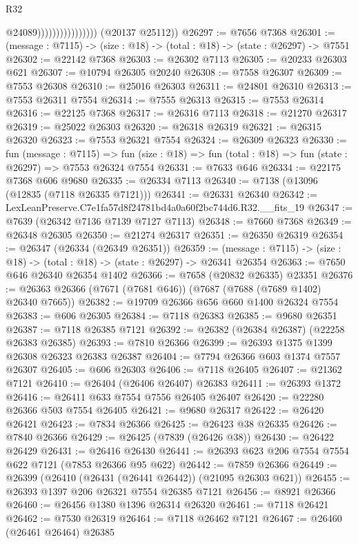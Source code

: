 \begin{lexlean}{R32}
\begin{coremodule}
                                      @24089))))))))))))))))
      (@20137 @25112))
@26297 := @7656 @7368
@26301 := (message : @7115) -> (size : @18) -> (total : @18) -> (state : @26297) -> @7551
@26302 := @22142 @7368
@26303 := @26302 @7113
@26305 := @20233 @26303 @621
@26307 := @10794 @26305 @20240
@26308 := @7558 @26307
@26309 := @7553 @26308
@26310 := @25016 @26303
@26311 := @24801 @26310
@26313 := @7553 @26311 @7554
@26314 := @7555 @26313
@26315 := @7553 @26314
@26316 := @22125 @7368
@26317 := @26316 @7113
@26318 := @21270 @26317
@26319 := @25022 @26303
@26320 := @26318 @26319
@26321 := @26315 @26320
@26323 := @7553 @26321 @7554
@26324 := @26309 @26323
@26330 := fun (message : @7115) =>
  fun (size : @18) => fun (total : @18) => fun (state : @26297) => @7553 @26324 @7554
@26331 := @7633 @646
@26334 := @22175 @7368 @606 @9680
@26335 := @26334 @7113
@26340 := @7138 (@13096 (@12835 (@7118 @26335 @7121)))
@26341 := @26331 @26340
@26342 := LexLeanPreserve.C7e1fa57d8f24781bd4a0a60f2bc744d6.R32.__fits_19
@26347 := @7639 (@26342 @7136 @7139 @7127 @7113)
@26348 := @7660 @7368
@26349 := @26348 @26305
@26350 := @21274 @26317
@26351 := @26350 @26319
@26354 := @26347 (@26334 (@26349 @26351))
@26359 := (message : @7115) -> (size : @18) -> (total : @18) -> (state : @26297) -> @26341 @26354
@26363 := @7650 @646 @26340 @26354 @1402
@26366 := @7658 (@20832 @26335) @23351
@26376 := @26363 @26366 (@7671 (@7681 @646)) (@7687 (@7688 (@7689 @1402) @26340 @7665))
@26382 := @19709 @26366 @656 @660 @1400 @26324 @7554
@26383 := @606 @26305
@26384 := @7118 @26383
@26385 := @9680 @26351
@26387 := @7118 @26385 @7121
@26392 := @26382 (@26384 @26387) (@22258 @26383 @26385)
@26393 := @7810 @26366
@26399 := @26393 @1375 @1399 @26308 @26323 @26383 @26387
@26404 := @7794 @26366 @603 @1374 @7557 @26307
@26405 := @606 @26303
@26406 := @7118 @26405
@26407 := @21362 @7121
@26410 := @26404 (@26406 @26407) @26383
@26411 := @26393 @1372
@26416 := @26411 @633 @7554 @7556 @26405 @26407
@26420 := @22280 @26366 @503 @7554 @26405
@26421 := @9680 @26317
@26422 := @26420 @26421
@26423 := @7834 @26366
@26425 := @26423 @38 @26335
@26426 := @7840 @26366
@26429 := @26425 (@7839 (@26426 @38))
@26430 := @26422 @26429
@26431 := @26416 @26430
@26441 := @26393 @623 @206 @7554 @7554 @622 @7121 (@7853 @26366 @95 @622)
@26442 := @7859 @26366
@26449 := @26399 (@26410 (@26431 (@26441 @26442)) (@21095 @26303 @621))
@26455 := @26393 @1397 @206 @26321 @7554 @26385 @7121
@26456 := @8921 @26366
@26460 := @26456 @1380 @1396 @26314 @26320
@26461 := @7118 @26421
@26462 := @7530 @26319
@26464 := @7118 @26462 @7121
@26467 := @26460 (@26461 @26464) @26385

\end{coremodule}
\end{lexlean}

